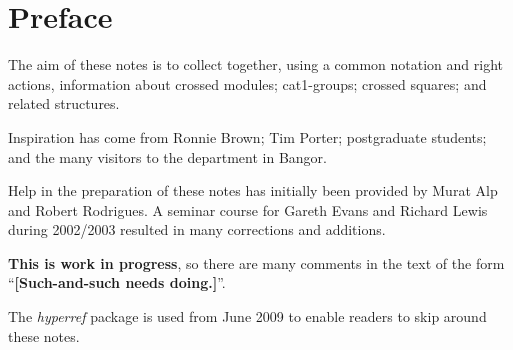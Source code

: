 
\section*{Preface}


The aim of these notes is to collect together, using a common notation
and right actions, information about crossed modules; cat1-groups;
crossed squares; and related structures.

Inspiration has come from Ronnie Brown; Tim Porter; postgraduate students;
and the many visitors to the department in Bangor.

Help in the preparation of these notes has initially been 
provided by Murat Alp and Robert Rodrigues.
A seminar course for Gareth Evans and Richard Lewis during 2002/2003
resulted in many corrections and additions.

{\bf This is work in progress}, so there are many comments in the text 
of the form\\ 
``{\bf [Such-and-such needs doing.]}''.

The \emph{hyperref} package is used from June 2009 to enable readers 
to skip around these notes. 

